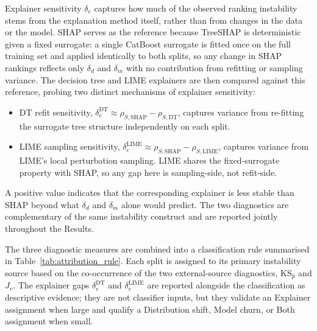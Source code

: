 \documentclass[oneside]{memoir} %
\begin{document}
Explainer sensitivity $\delta_e$ captures how much of the observed ranking instability stems from the explanation method itself, rather than from changes in the data or the model. SHAP serves as the reference because TreeSHAP is deterministic given a fixed surrogate: a single CatBoost surrogate is fitted once on the full training set and applied identically to both splits, so any change in SHAP rankings reflects only $\delta_d$ and $\delta_m$ with no contribution from refitting or sampling variance. The decision tree and LIME explainers are then compared against this reference, probing two distinct mechanisms of explainer sensitivity:
\begin{itemize}
\item DT refit sensitivity, $\delta_e^{\text{DT}} \approx \rho_{S,\text{SHAP}} - \rho_{S,\text{DT}}$, captures variance from re-fitting the surrogate tree structure independently on each split.
\item LIME sampling sensitivity, $\delta_e^{\text{LIME}} \approx \rho_{S,\text{SHAP}} - \rho_{S,\text{LIME}}$, captures variance from LIME's local perturbation sampling. LIME shares the fixed-surrogate property with SHAP, so any gap here is sampling-side, not refit-side.
\end{itemize}
A positive value indicates that the corresponding explainer is less stable than SHAP beyond what $\delta_d$ and $\delta_m$ alone would predict. The two diagnostics are complementary of the same instability construct and are reported jointly throughout the Results.

The three diagnostic measures are combined into a classification rule summarised in Table~\ref{tab:attribution_rule}. Each split is assigned to its primary instability source based on the co-occurrence of the two external-source diagnostics, $\text{KS}_{\hat{p}}$ and $J_v$. The explainer gaps $\delta_e^{\text{DT}}$ and $\delta_e^{\text{LIME}}$ are reported alongside the classification as descriptive evidence; they are not classifier inputs, but they validate an Explainer assignment when large and qualify a Distribution shift, Model churn, or Both assignment when small.
\end{document}
